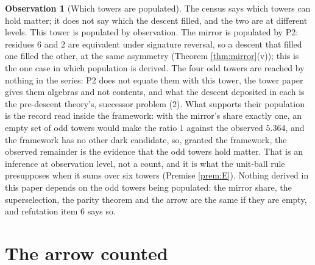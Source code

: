 \documentclass[11pt]{article}
\theoremstyle{definition}
\newtheorem{observation}[theorem]{Observation}
\let\oldsection\section
\renewcommand{\section}{\clearpage\oldsection}   %
\begin{document}
\begin{observation}[Which towers are populated]\label{obs:population}
The census says which towers can hold matter; it does not say which the descent filled, and the two are at different levels. This tower is populated by observation. The mirror is populated by P2: residues $6$ and $2$ are equivalent under signature reversal, so a descent that filled one filled the other, at the same asymmetry (Theorem \ref{thm:mirror}(v)); this is the one case in which population is derived. The four odd towers are reached by nothing in the series: P2 does not equate them with this tower, the tower paper gives them algebras and not contents, and what the descent deposited in each is the pre-descent theory's, successor problem (2). What supports their population is the record read inside the framework: with the mirror's share exactly one, an empty set of odd towers would make the ratio $1$ against the observed $5.364$, and the framework has no other dark candidate, so, granted the framework, the observed remainder is the evidence that the odd towers hold matter. That is an inference at observation level, not a count, and it is what the unit-ball rule presupposes when it sums over six towers (Premise \ref{prem:E}). Nothing derived in this paper depends on the odd towers being populated: the mirror share, the superselection, the parity theorem and the arrow are the same if they are empty, and refutation item 6 says so.
\end{observation}

\section{The arrow counted}\label{sec:arrow}
\end{document}
